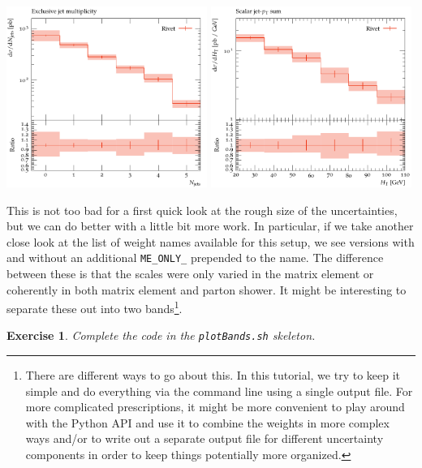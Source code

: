 \documentclass[10pt,fleqn]{scrartcl}
\theoremstyle{exstyle}
\newtheorem{exercise}{Exercise}
\begin{document}
\begin{center}
\includegraphics[width=0.49\textwidth]{figures/jets_excl_all_band.pdf}
\includegraphics[width=0.49\textwidth]{figures/HT_all_band.pdf}
\end{center}

This is not too bad for a first quick look at the rough size of the uncertainties,
but we can do better with a little bit more work. 
In particular, if we take another close look at the list of weight names available
for this setup, we see versions with and without an additional \verb|ME_ONLY_| prepended
to the name. The difference between these is that the scales were only varied in
the matrix element or coherently in both matrix element and parton shower.
It might be interesting to separate these out into two bands\footnote{There are 
different ways to go about this. In this tutorial, we try to keep it simple and 
do everything via the command line using a single output file. For more complicated 
prescriptions, it might be more convenient to play around with the Python API and 
use it to combine the weights in more complex ways and/or to write out a separate output 
file for different uncertainty components in order to keep things potentially more organized.}.


\begin{exercise}
Complete the code in the \verb|plotBands.sh| skeleton.
\end{exercise}
\end{document}
